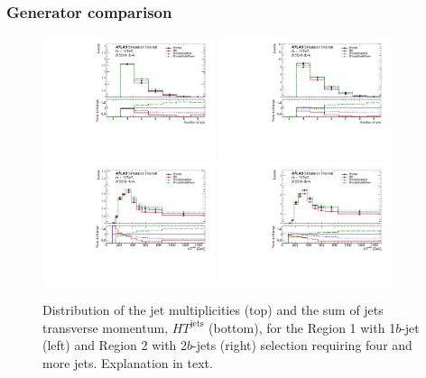 %
%
%
%
%
\subsubsection{Generator comparison}



\begin{figure}[!htb]
\centering
\includegraphics[width=0.45\textwidth]{Plots/ttV/generator/c_Region_0_nJets}
\includegraphics[width=0.45\textwidth]{Plots/ttV/generator/c_Region_1_nJets}\\
\includegraphics[width=0.45\textwidth]{Plots/ttV/generator/c_Region_0_HT_jets}
\includegraphics[width=0.45\textwidth]{Plots/ttV/generator/c_Region_1_HT_jets}\\
  \caption{Distribution of the jet multiplicities (top) and the sum of jets transverse momentum, $HT^{\text{jets}}$ (bottom), for the Region 1 with 1$b$-jet (left) and Region 2 with 2$b$-jets (right) selection requiring four and more jets. Explanation in text. \label{ttV:4j12b}}
\end{figure}


